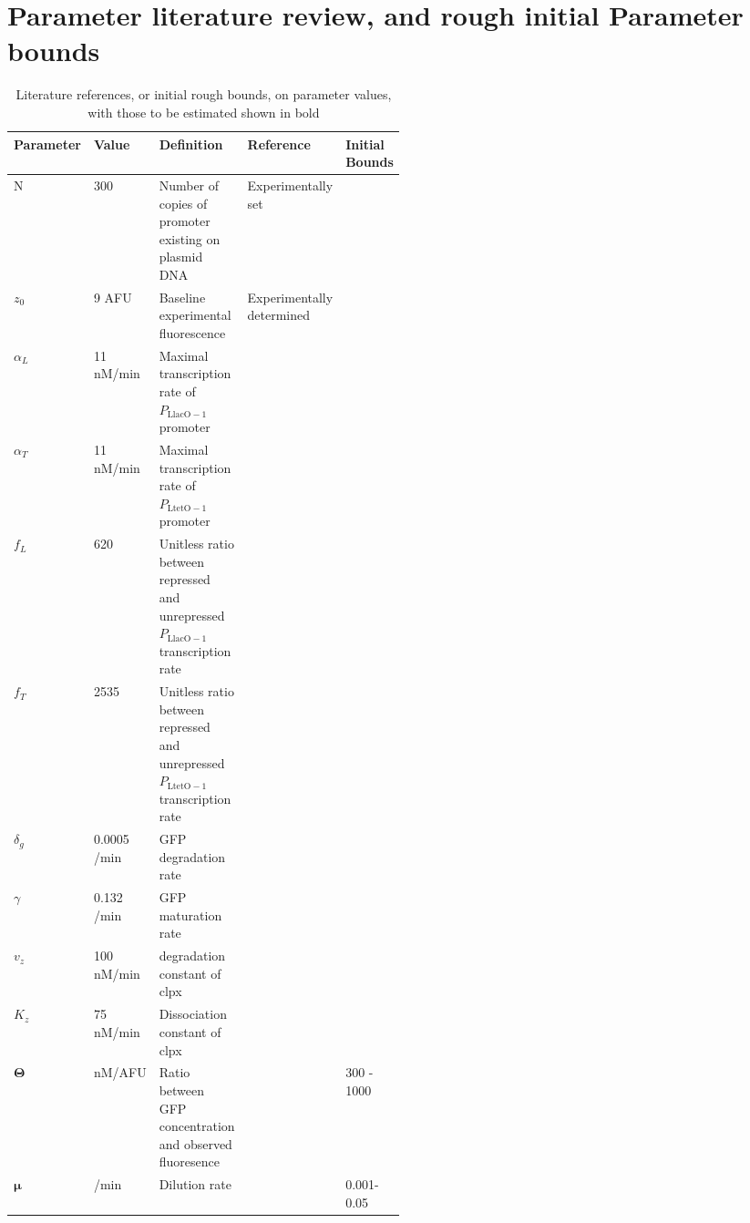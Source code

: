 \documentclass[10pt,journal]{./IEEE_latex_class/IEEEtran}
\begin{document}
\clearpage

\section{Parameter literature review, and rough initial Parameter bounds}
\label{Parameter literature review}
\setcounter{figure}{0}    

\begin{table}[h!]
\renewcommand{\arraystretch}{1.3}
\caption{Literature references, or initial rough bounds, on parameter values, with those to be estimated shown in bold}
\label{Parameter_literature_review_table}
\centering
\begin{tabular}{| l | l | p{0.3\linewidth} | p{0.1\linewidth} | p{0.1\linewidth} |}
\hline \textbf{Parameter} &  \textbf{Value} & \textbf{Definition} & \textbf{Reference} & \textbf{Initial Bounds}  \\
\hline \hline N & 300 & Number of copies of promoter existing on plasmid DNA & Experimentally set & \\
\hline $z_{0}$ &   9 AFU & Baseline experimental fluorescence & Experimentally determined &  \\
\hline $\alpha_{L}$ & 11 nM/min & Maximal transcription rate of $P_\mathrm{LlacO-1}$ promoter & \cite{Lutz1997} &\\
\hline $\alpha_{T}$  & 11 nM/min  & Maximal transcription rate of $P_{\mathrm{LtetO-1}}$ promoter  & \cite{Lutz1997}& \\
\hline $f_{L}$ & 620 & Unitless ratio between repressed and unrepressed $P_\mathrm{LlacO-1}$ transcription rate  & \cite{Lutz1997}  &  \\ 
\hline $f_{T}$ & 2535 & Unitless ratio between repressed and unrepressed $P_{\mathrm{LtetO-1}}$ transcription rate   & \cite{Lutz1997} &\\
\hline $\delta_{g}$  & 0.0005 /min  & GFP degradation rate & \cite{Andersen1998} &\\
\hline $\gamma$ &  0.132 /min & GFP maturation rate & \cite{Iizuka2011} & \\
\hline $v_{z}$ & 100 nM/min & degradation constant of clpx & \cite{Hersch2004} &\\
\hline $K_{z}$   &   75 nM/min & Dissociation constant of clpx & \cite{Hersch2004} &\\
\hline $\boldsymbol{\Theta}$  &   nM/AFU & Ratio between GFP concentration and observed fluoresence & & 300 - 1000  \\
\hline $\boldsymbol{\mu}$ &  /min & Dilution rate & & 0.001-0.05\\

\end{tabular}
\end{table}
\end{document}
